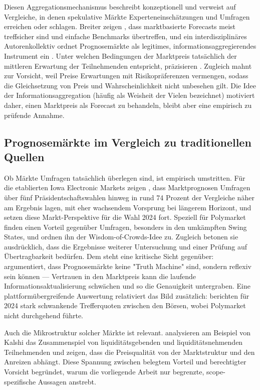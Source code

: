 Diesen Aggregationsmechanismus beschreibt \citet{zotero_poly_005} konzeptionell
und verweist auf Vergleiche, in denen spekulative Märkte Experteneinschätzungen
und Umfragen erreichen oder schlagen. Breiter zeigen \citet{lit_wolfers_2004},
dass marktbasierte Forecasts meist treffsicher sind und einfache Benchmarks
übertreffen, und ein interdisziplinäres Autorenkollektiv ordnet Prognosemärkte
als legitimes, informationsaggregierendes Instrument ein \citep{lit_arrow_2008}.
Unter welchen Bedingungen der Marktpreis tatsächlich der mittleren Erwartung der
Teilnehmenden entspricht, präzisieren \citet{lit_wolfers_2006}. Zugleich mahnt
\citet{lit_manski_2006} zur Vorsicht, weil Preise Erwartungen mit
Risikopräferenzen vermengen, sodass die Gleichsetzung von Preis und
Wahrscheinlichkeit nicht unbesehen gilt. Die Idee der Informationsaggregation
(häufig als Weisheit der Vielen bezeichnet) motiviert daher, einen Marktpreis als
Forecast zu behandeln, bleibt aber eine empirisch zu prüfende Annahme.

\subsection{Prognosemärkte im Vergleich zu traditionellen Quellen}
Ob Märkte Umfragen tatsächlich überlegen sind, ist empirisch umstritten. Für die
etablierten Iowa Electronic Markets zeigen \citet{lit_berg_2008}, dass
Marktprognosen Umfragen über fünf Präsidentschaftswahlen hinweg in rund 74 Prozent
der Vergleiche näher am Ergebnis lagen, mit eher wachsendem Vorsprung bei längerem
Horizont, und \citet{lit_iem_2024} setzen diese Markt-Perspektive für die Wahl 2024
fort. Speziell für Polymarket finden \citet{zotero_poly_002} einen Vorteil
gegenüber Umfragen, besonders in den umkämpften Swing States, und ordnen ihn der
Wisdom-of-Crowds-Idee zu. Zugleich betonen sie ausdrücklich, dass die Ergebnisse
weiterer Untersuchung und einer Prüfung auf Übertragbarkeit bedürfen. Dem steht
eine kritische Sicht gegenüber: \citet{zotero_poly_009} argumentiert, dass
Prognosemärkte keine "Truth Machine" sind, sondern reflexiv sein können ---
Vertrauen in den Marktpreis kann die laufende Informationsaktualisierung
schwächen und so die Genauigkeit untergraben. Eine plattformübergreifende
Auswertung relativiert das Bild zusätzlich: \citet{lit_poly24_accuracy} berichten
für 2024 stark schwankende Trefferquoten zwischen den Börsen, wobei Polymarket
nicht durchgehend führte.

Auch die Mikrostruktur solcher Märkte ist relevant. \citet{zotero_poly_006}
analysieren am Beispiel von Kalshi das Zusammenspiel von liquiditätsgebenden und
liquiditätsnehmenden Teilnehmenden und zeigen, dass die Preisqualität von der
Marktstruktur und den Anreizen abhängt. Diese Spannung zwischen belegtem Vorteil
und berechtigter Vorsicht begründet, warum die vorliegende Arbeit nur begrenzte,
scope-spezifische Aussagen anstrebt.

